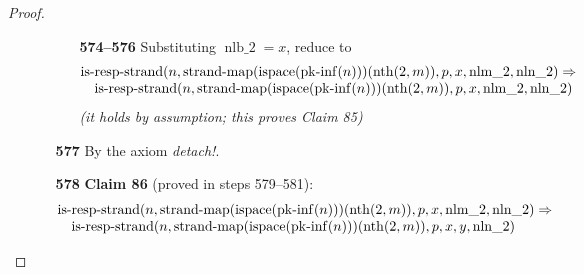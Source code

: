 \documentclass[11pt]{article}
\theoremstyle{plain}
\begin{document}
\begin{proof}
\begin{itemize}[leftmargin=2.8em, itemsep=4pt, parsep=1pt]
\begin{itemize}[leftmargin=2.8em, itemsep=4pt, parsep=1pt]
  \begin{itemize}[leftmargin=2.8em, itemsep=4pt, parsep=1pt]
  \item[\textbf{574--576}] Substituting $\operatorname{nlb\_2} = x$, reduce to
\begin{equation*}
\begin{array}{@{}l@{}} \operatorname{is\text{-}resp\text{-}strand}(n, \operatorname{strand\text{-}map}(\operatorname{ispace}(\operatorname{pk\text{-}inf}(n)))(\operatorname{nth}(2, m)), p, x, \operatorname{nlm\_2}, \operatorname{nln\_2}) \Rightarrow  \\ \quad \operatorname{is\text{-}resp\text{-}strand}(n, \operatorname{strand\text{-}map}(\operatorname{ispace}(\operatorname{pk\text{-}inf}(n)))(\operatorname{nth}(2, m)), p, x, \operatorname{nlm\_2}, \operatorname{nln\_2}) \end{array}
\end{equation*}
  \emph{(it holds by assumption; this proves Claim 85)}
  \end{itemize}
  \item[\textbf{577}] By the axiom \emph{detach!}.
  \item[\textbf{578}] \textbf{Claim 86} (proved in steps 579--581):
\begin{equation*}
\begin{array}{@{}l@{}} \operatorname{is\text{-}resp\text{-}strand}(n, \operatorname{strand\text{-}map}(\operatorname{ispace}(\operatorname{pk\text{-}inf}(n)))(\operatorname{nth}(2, m)), p, x, \operatorname{nlm\_2}, \operatorname{nln\_2}) \Rightarrow  \\ \quad \operatorname{is\text{-}resp\text{-}strand}(n, \operatorname{strand\text{-}map}(\operatorname{ispace}(\operatorname{pk\text{-}inf}(n)))(\operatorname{nth}(2, m)), p, x, y, \operatorname{nln\_2}) \end{array}
\end{equation*}


\end{itemize}
\end{itemize}
\end{proof}
\end{document}
